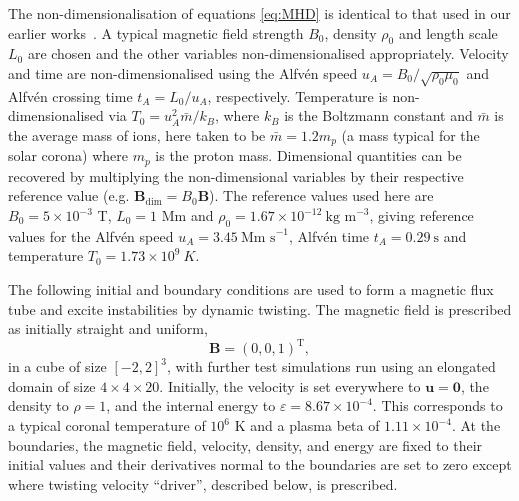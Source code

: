 \documentclass[fleqn,usenatbib]{mnras}
\newcommand{\rs}[2]{{#2}}
\renewcommand{\vec}[1]{{\bm #1}}
\begin{document}
The non-dimensionalisation of equations \eqref{eq:MHD} is identical to that used in
our earlier works~\citep{quinnEffectAnisotropicViscosity2020,quinnKelvinHelmholtzInstabilityCollapse2021}. A typical magnetic
field strength $B_0$, density $\rho_0$ and length scale $L_0$ are
chosen and the other variables non-dimensionalised
appropriately. Velocity and time are non-dimensionalised using the
Alfv\'en speed $u_A = B_0 / \sqrt{\rho_0 \mu_0}$ and Alfv\'en crossing 
time $t_A = L_0/u_A$, respectively. Temperature is non-dimensionalised
via $T_0 = u_A^2 \bar{m} / k_B$, where $k_B$ is the Boltzmann constant
and $\bar{m}$ is the average mass of ions, here taken to be $\bar{m} =
1.2m_p$ (a mass typical for the solar corona) where $m_p$ is the
proton mass. Dimensional quantities can be recovered by multiplying
the non-dimensional variables by their respective reference value
(e.g. $\vec{B}_{\dim} = B_0 \vec{B}$). The reference values used here
are $B_0 = 5 \times 10^{-3}$ T, $L_0 = 1$ Mm and $\rho_0 = 1.67 \times
10^{-12} \ \text{kg m}^{-3}$, giving reference values for the Alfv\'en
speed $u_A = 3.45\ \text{Mm s}^{-1}$, Alfv\'en time $t_A =
0.29\ \text{s}$ and temperature $T_0 = 1.73 \times 10^{9}\ K$.      

\rs{}{The following initial and boundary conditions are used to form a
magnetic flux tube and excite instabilities by dynamic twisting.} 
The magnetic field is prescribed as initially straight and uniform,
\begin{equation}
\vec{B} = (0, 0, 1)^{\text{T}},
\end{equation}
in a cube of \rs{dimension}{size} $[-2,2]^3$, with further test simulations run using an elongated domain of size $4\times4\times20$. \rs{The}{Initially, the} velocity is set
everywhere to $\vec{u} = \vec{0}$, the density to $\rho = 1$,
\rs{}{and} the
internal energy to $\varepsilon = 8.67\times 10^{-4}$. This corresponds
to a typical coronal temperature of $10^6$ K and a plasma beta of $1.11 \times 10^{-4}$. At the
boundaries, the magnetic field, \rs{}{velocity,} density, and energy are fixed to their
initial values \rs{}{and their derivatives normal to the
boundaries are set to zero} \rs{and the velocity to zero}{} except
\rs{the boundaries}{where twisting velocity ``driver''}, described
below, is prescribed.
\rs{The spatial
derivatives of these variables are also set to zero at the
boundaries.}{} \rs{The resolution is $512$ grid points per dimension,
comparable to the highest resolution kink instability studies
of~\cite{hoodCoronalHeatingMagnetic2009} or medium resolution studies
of~\cite{barefordShockHeatingNumerical2015}.}{}
\end{document}
